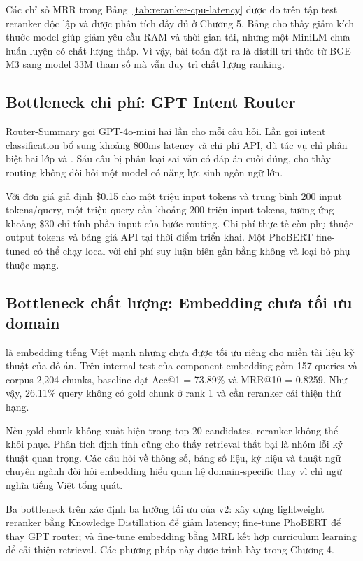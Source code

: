 \documentclass[../DoAn.tex]{subfiles}
\begin{document}
Các chỉ số MRR trong Bảng~\ref{tab:reranker-cpu-latency} được đo trên tập test reranker độc lập và được phân tích đầy đủ ở Chương 5. Bảng cho thấy giảm kích thước model giúp giảm yêu cầu RAM và thời gian tải, nhưng một MiniLM chưa huấn luyện có chất lượng thấp. Vì vậy, bài toán đặt ra là distill tri thức từ BGE-M3 sang model 33M tham số mà vẫn duy trì chất lượng ranking.

\subsection{Bottleneck chi phí: GPT Intent Router}
\label{subsection:3.5.2}

Router-Summary gọi GPT-4o-mini hai lần cho mỗi câu hỏi. Lần gọi intent classification bổ sung khoảng 800ms latency và chi phí API, dù tác vụ chỉ phân biệt hai lớp  và . Sáu câu bị phân loại sai vẫn có đáp án cuối đúng, cho thấy routing không đòi hỏi một model có năng lực sinh ngôn ngữ lớn.

Với đơn giá giả định \$0.15 cho một triệu input tokens và trung bình 200 input tokens/query, một triệu query cần khoảng 200 triệu input tokens, tương ứng khoảng \$30 chỉ tính phần input của bước routing. Chi phí thực tế còn phụ thuộc output tokens và bảng giá API tại thời điểm triển khai. Một PhoBERT fine-tuned có thể chạy local với chi phí suy luận biên gần bằng không và loại bỏ phụ thuộc mạng.

\subsection{Bottleneck chất lượng: Embedding chưa tối ưu domain}
\label{subsection:3.5.3}

 là embedding tiếng Việt mạnh nhưng chưa được tối ưu riêng cho miền tài liệu kỹ thuật của đồ án. Trên internal test của component embedding gồm 157 queries và corpus 2,204 chunks, baseline đạt Acc@1 = 73.89\% và MRR@10 = 0.8259. Như vậy, 26.11\% query không có gold chunk ở rank 1 và cần reranker cải thiện thứ hạng.

Nếu gold chunk không xuất hiện trong top-20 candidates, reranker không thể khôi phục. Phân tích định tính cũng cho thấy retrieval thất bại là nhóm lỗi kỹ thuật quan trọng. Các câu hỏi về thông số, bảng số liệu, ký hiệu và thuật ngữ chuyên ngành đòi hỏi embedding hiểu quan hệ domain-specific thay vì chỉ ngữ nghĩa tiếng Việt tổng quát.

Ba bottleneck trên xác định ba hướng tối ưu của v2: xây dựng lightweight reranker bằng Knowledge Distillation để giảm latency; fine-tune PhoBERT để thay GPT router; và fine-tune embedding bằng MRL kết hợp curriculum learning để cải thiện retrieval. Các phương pháp này được trình bày trong Chương 4.
\end{document}
